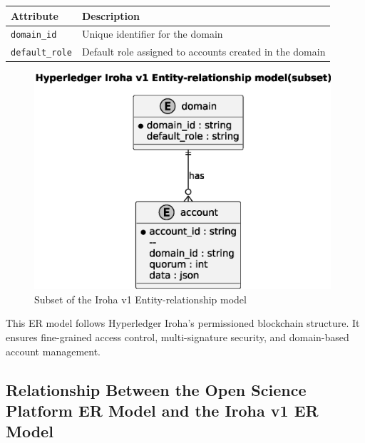 \documentclass{article}
\begin{document}
\begin{table}[h]
      \centering
      \label{tab:domain_entity}
      \renewcommand{\arraystretch}{1.2}
      \begin{tabularx}{\textwidth}{|l|X|}
            \hline
            \textbf{Attribute}     & \textbf{Description}                                    \\ \hline
            \texttt{domain\_id}    & Unique identifier for the domain                        \\ \hline
            \texttt{default\_role} & Default role assigned to accounts created in the domain \\ \hline
      \end{tabularx}
\end{table}


\begin{figure}[htbp]
      \centering
      \includegraphics[width=0.98\textwidth, keepaspectratio]{iroha_v1_er_model.eps}
      \caption{Subset of the Iroha v1 Entity-relationship model}
      \label{fig:iroha_v1_er_model}
\end{figure}


This ER model follows Hyperledger Iroha’s permissioned blockchain structure. It ensures fine-grained access control, multi-signature security, and domain-based account management.


\subsection{Relationship Between the Open Science Platform ER Model and the Iroha v1 ER Model}
\end{document}
